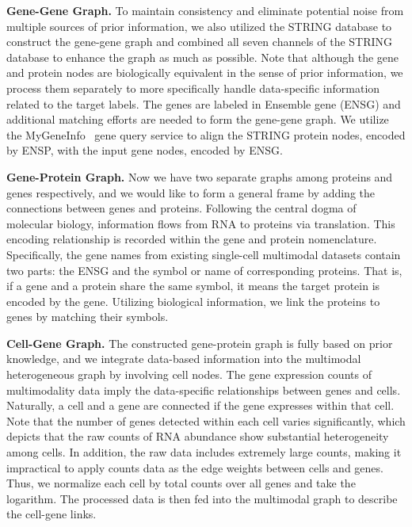 \noindent\textbf{Gene-Gene Graph.} To maintain consistency and eliminate potential noise from multiple sources of prior information, we also utilized the STRING database to construct the gene-gene graph and combined all seven channels of the STRING database to enhance the graph as much as possible. Note that although the gene and protein nodes are biologically equivalent in the sense of prior information, we process them separately to more specifically handle data-specific information related to the target labels. The genes are labeled in Ensemble gene (ENSG) and additional matching efforts are needed to form the gene-gene graph. We utilize the MyGeneInfo~\cite{wu2014mygene} gene query service to align the STRING protein nodes, encoded by ENSP, with the input gene nodes, encoded by ENSG.


\noindent\textbf{Gene-Protein Graph.} Now we have two separate graphs among proteins and genes respectively, and we would like to form a general frame by adding the connections between genes and proteins. Following the central dogma of molecular biology, information flows from RNA to proteins via translation. This encoding relationship is recorded within the gene and protein nomenclature. Specifically, the gene names from existing single-cell multimodal datasets contain two parts: the ENSG and the symbol or name of corresponding proteins. That is, if a gene and a protein share the same symbol, it means the target protein is encoded by the gene. Utilizing biological information, we link the proteins to genes by matching their symbols. 


\noindent\textbf{Cell-Gene Graph.} The constructed gene-protein graph is fully based on prior knowledge, and we integrate data-based information into the multimodal heterogeneous graph by involving cell nodes. The gene expression counts of multimodality data imply the data-specific relationships between genes and cells. Naturally, a cell and a gene are connected if the gene expresses within that cell. Note that the number of genes detected within each cell varies significantly, which depicts that the raw counts of RNA abundance show substantial heterogeneity among cells. In addition, the raw data includes extremely large counts, making it impractical to apply counts data as the edge weights between cells and genes. Thus, we normalize each cell by total counts over all genes and take the logarithm. 
The processed data is then fed into the multimodal graph to describe the cell-gene links.



